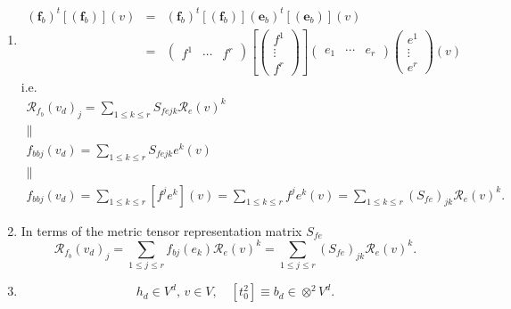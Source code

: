 \documentclass[aps,preprint]{revtex4}
\begin{document}
\begin{enumerate}
\begin{enumerate}
\begin{enumerate}
\item 
\begin{eqnarray}
\left( \boldsymbol{f}_{b}\right) ^{t}\left[ \left( \boldsymbol{f}_{b}\right) %
\right] \left( v\right) &=&\left( \boldsymbol{f}_{b}\right) ^{t}\left[
\left( \boldsymbol{f}_{b}\right) \right] \left( \overset{}{\boldsymbol{e}_{b}%
}\right) ^{t}\left[ \left( \overset{}{\boldsymbol{e}_{b}}\right) \right]
\left( \overset{}{v}\right) \\
&=&\left( 
\begin{array}{ccc}
f^{1} & \cdots & f^{r}%
\end{array}%
\right) \left[ \left( 
\begin{array}{c}
f^{1} \\ 
\vdots \\ 
f^{r}%
\end{array}%
\right) \right] \left( 
\begin{array}{ccc}
e_{1} & \cdots & e_{r}%
\end{array}%
\right) \left( 
\begin{array}{c}
e^{1} \\ 
\vdots \\ 
e^{r}%
\end{array}%
\right) \left( \overset{}{v}\right)
\end{eqnarray}%
i.e.%
\begin{gather}
\mathcal{R}_{f_{b}}\left( v_{d}\right) _{j}=\sum_{1\leq k\leq r}S_{fejk}%
\mathcal{R}_{e}\left( v\right) ^{k} \\
\parallel \\
f_{bbj}\left( v_{d}\right) =\sum_{1\leq k\leq r}S_{fejk}e^{k}\left( v\right)
\\
\parallel \\
f_{bbj}\left( v_{d}\right) =\sum_{1\leq k\leq r}\left[ f^{j}e^{k}\right]
\left( v\right) =\sum_{1\leq k\leq r}f^{j}e^{k}\left( v\right) =\sum_{1\leq
k\leq r}\left( S_{fe}\right) _{jk}\mathcal{R}_{e}\left( v\right) ^{k}.
\end{gather}

\item In terms of the metric tensor representation matrix $S_{fe}$ 
\begin{equation}
\mathcal{R}_{f_{b}}\left( v_{d}\right) _{j}=\sum_{1\leq j\leq r}f_{bj}\left(
e_{k}\right) \mathcal{R}_{e}\left( v\right) ^{k}=\sum_{1\leq j\leq r}\left(
S_{fe}\right) _{jk}\mathcal{R}_{e}\left( v\right) ^{k}.
\end{equation}

\item 
\begin{equation}
h_{d}\in V^{d},\,v\in V,\quad \left[ t_{0}^{2}\right] \equiv b_{d}\in
\otimes ^{2}V^{d}.
\end{equation}
\end{enumerate}
\end{enumerate}


\end{enumerate}
\end{document}
